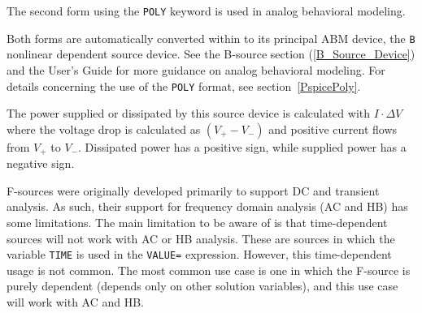 \begin{Device}
The second form using the \texttt{POLY} keyword is used in analog behavioral
modeling.

Both forms are automatically converted within \Xyce{} to its principal
ABM device, the \texttt{B} nonlinear dependent source device. See the B-source
section (\ref{B_Source_Device}) and the \Xyce{} User's Guide for more guidance
on analog behavioral modeling.  For details concerning the use of the
\texttt{POLY} format, see section~\ref{PspicePoly}.

The power supplied or dissipated by this source device is calculated 
with $I \cdot \Delta V$ where the voltage drop is calculated as $(V_+ - V_-)$ 
and positive current flows from $V_+$ to $V_-$.  Dissipated power has a
positive sign, while supplied power has a negative sign.

F-sources were originally developed primarily to support DC and transient analysis.  
As such, their support for frequency domain analysis (AC and HB) has some limitations.  
The main limitation to be aware of is that time-dependent sources will not work with AC or HB analysis.  
These are sources in which the variable \texttt{TIME} is used in the \texttt{VALUE=} expression. 
However, this time-dependent usage is not common.  The most 
common use case is one in which the F-source is purely dependent (depends only 
on other solution variables), and this use case will work with AC and HB.  

\end{Device}
